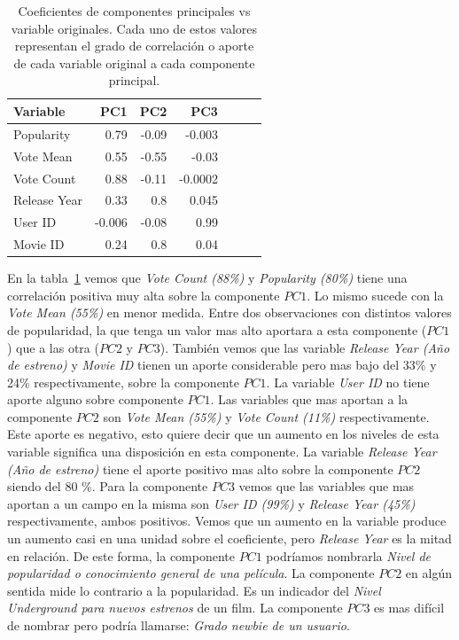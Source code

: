 \documentclass[11pt,a4paper,twoside]{thesis}
\begin{document}
\begin{table}[h!]
	\centering
	\begin{tabular}{lrrrrrr}
		\toprule Variable   & PC1    & PC2   & PC3     \\
		\midrule Popularity & 0.79   & -0.09 & -0.003  \\
		Vote Mean           & 0.55   & -0.55 & -0.03   \\
		Vote Count          & 0.88   & -0.11 & -0.0002 \\
		Release Year        & 0.33   & 0.8   & 0.045   \\
		User ID             & -0.006 & -0.08 & 0.99    \\
		Movie ID            & 0.24   & 0.8   & 0.04    \\
		\bottomrule
	\end{tabular}

	\caption{Coeficientes de componentes principales vs variable originales. Cada uno de estos valores representan el grado de correlación o aporte de cada variable original a cada componente principal.}

	\label{fig:loadingsTable}
\end{table}

En la tabla~\ref{fig:loadingsTable} vemos que \textit{Vote Count (88\%)} y
\textit{Popularity (80\%)} tiene una correlación positiva muy alta sobre la
componente $PC1$. Lo mismo sucede con la \textit{Vote Mean (55\%)} en menor
medida. Entre dos observaciones con distintos valores de popularidad, la que
tenga un valor mas alto aportara a esta componente ($PC1$) que a las otra
($PC2$ y $PC3$). También vemos que las variable \textit{Release Year (Año de
	estreno)} y \textit{Movie ID} tienen un aporte considerable pero mas bajo del
33\% y 24\% respectivamente, sobre la componente $PC1$. La variable
\textit{User ID} no tiene aporte alguno sobre componente $PC1$. Las variables
que mas aportan a la componente $PC2$ son \textit{Vote Mean (55\%)} y
\textit{Vote Count (11\%)} respectivamente. Este aporte es negativo, esto
quiere decir que un aumento en los niveles de esta variable significa una
disposición en esta componente. La variable \textit{Release Year (Año de
	estreno)} tiene el aporte positivo mas alto sobre la componente $PC2$ siendo
del 80 \%. Para la componente $PC3$ vemos que las variables que mas aportan a
un campo en la misma son \textit{User ID (99\%)} y \textit{Release Year (45\%)}
respectivamente, ambos positivos. Vemos que un aumento en la variable
 produce un aumento casi en una unidad sobre el coeficiente, pero
\textit{Release Year} es la mitad en relación. De este forma, la componente
$PC1$ podríamos nombrarla \textit{Nivel de popularidad o conocimiento general
	de una película}. La componente $PC2$ en algún sentida mide lo contrario a la
popularidad. Es un indicador del \textit{Nivel Underground para nuevos
	estrenos} de un film. La componente $PC3$ es mas difícil de nombrar pero podría
llamarse: \textit{Grado newbie de un usuario}.
\end{document}
